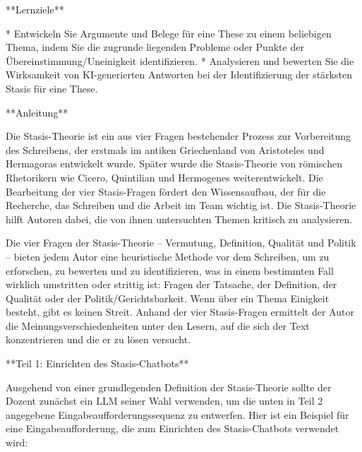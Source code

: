 \documentclass[
  ngerman,
  letterpaper,
  DIV=11]{scrreprt}
\newenvironment{Shaded}{\begin{snugshade}}{\end{snugshade}}
\newcommand{\NormalTok}[1]{\textcolor[rgb]{0.00,0.23,0.31}{#1}}
\newcommand{\SpecialStringTok}[1]{\textcolor[rgb]{0.13,0.47,0.30}{#1}}
\begin{document}
\begin{tcolorbox}[enhanced jigsaw, left=2mm, bottomrule=.15mm, arc=.35mm, rightrule=.15mm, colframe=quarto-callout-note-color-frame, coltitle=black, colback=white, toprule=.15mm, toptitle=1mm, colbacktitle=quarto-callout-note-color!10!white, title=\textcolor{quarto-callout-note-color}{\faInfo}\hspace{0.5em}{Tutor-Aufgabe: Argumentationsbau mit der Stasis-Theorie}, opacitybacktitle=0.6, leftrule=.75mm, bottomtitle=1mm, titlerule=0mm, opacityback=0, breakable]

\begin{Shaded}
\begin{Highlighting}[]
\NormalTok{**Lernziele**}

\SpecialStringTok{* }\NormalTok{Entwickeln Sie Argumente und Belege für eine These zu einem beliebigen Thema, indem Sie die zugrunde liegenden Probleme oder Punkte der Übereinstimmung/Uneinigkeit identifizieren.}
\SpecialStringTok{* }\NormalTok{Analysieren und bewerten Sie die Wirksamkeit von KI{-}generierten Antworten bei der Identifizierung der stärksten Stasis für eine These.}

\NormalTok{**Anleitung**}

\NormalTok{Die Stasis{-}Theorie ist ein aus vier Fragen bestehender Prozess zur Vorbereitung des Schreibens, der erstmals im antiken Griechenland von Aristoteles und Hermagoras entwickelt wurde. Später wurde die Stasis{-}Theorie von römischen Rhetorikern wie Cicero, Quintilian und Hermogenes weiterentwickelt. Die Bearbeitung der vier Stasis{-}Fragen fördert den Wissensaufbau, der für die Recherche, das Schreiben und die Arbeit im Team wichtig ist. Die Stasis{-}Theorie hilft Autoren dabei, die von ihnen untersuchten Themen kritisch zu analysieren.}

\NormalTok{Die vier Fragen der Stasis{-}Theorie – Vermutung, Definition, Qualität und Politik – bieten jedem Autor eine heuristische Methode vor dem Schreiben, um zu erforschen, zu bewerten und zu identifizieren, was in einem bestimmten Fall wirklich umstritten oder strittig ist: Fragen der Tatsache, der Definition, der Qualität oder der Politik/Gerichtsbarkeit. Wenn über ein Thema Einigkeit besteht, gibt es keinen Streit. Anhand der vier Stasis{-}Fragen ermittelt der Autor die Meinungsverschiedenheiten unter den Lesern, auf die sich der Text konzentrieren und die er zu lösen versucht.}

\NormalTok{**Teil 1: Einrichten des Stasis{-}Chatbots**}

\NormalTok{Ausgehend von einer grundlegenden Definition der Stasis{-}Theorie sollte der Dozent zunächst ein LLM seiner Wahl verwenden, um die unten in Teil 2 angegebene Eingabeaufforderungssequenz zu entwerfen. Hier ist ein Beispiel für eine Eingabeaufforderung, die zum Einrichten des Stasis{-}Chatbots verwendet wird:}


\end{Highlighting}
\end{Shaded}
\end{tcolorbox}
\end{document}
